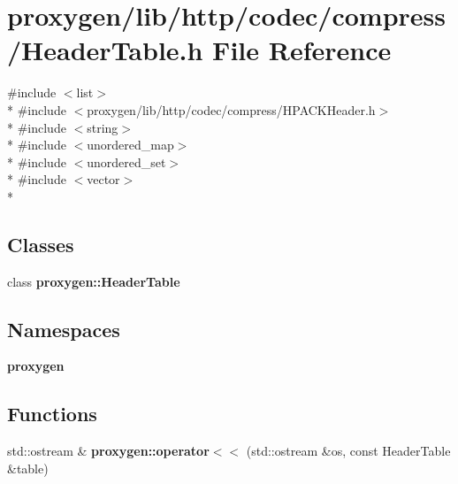 \section{proxygen/lib/http/codec/compress/\+Header\+Table.h File Reference}
\label{HeaderTable_8h}
{\ttfamily \#include $<$list$>$}\\*
{\ttfamily \#include $<$proxygen/lib/http/codec/compress/\+H\+P\+A\+C\+K\+Header.\+h$>$}\\*
{\ttfamily \#include $<$string$>$}\\*
{\ttfamily \#include $<$unordered\+\_\+map$>$}\\*
{\ttfamily \#include $<$unordered\+\_\+set$>$}\\*
{\ttfamily \#include $<$vector$>$}\\*
\subsection*{Classes}
\begin{DoxyCompactItemize}
\item 
class {\bf proxygen\+::\+Header\+Table}
\end{DoxyCompactItemize}
\subsection*{Namespaces}
\begin{DoxyCompactItemize}
\item 
 {\bf proxygen}
\end{DoxyCompactItemize}
\subsection*{Functions}
\begin{DoxyCompactItemize}
\item 
std\+::ostream \& {\bf proxygen\+::operator$<$$<$} (std\+::ostream \&os, const Header\+Table \&table)
\end{DoxyCompactItemize}
